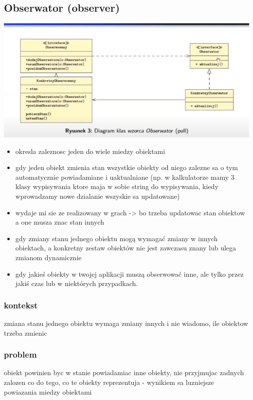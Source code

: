 \documentclass[11pt]{article}
\begin{document}
\subsection{Obserwator (observer)}
\label{sec:org1eeafc9}
\begin{center}
\includegraphics[width=.9\linewidth]{./obserwator.png}
\end{center}
\begin{itemize}
\item okresla zaleznosc jeden do wiele miedzy obiektami
\item gdy jeden obiekt zmienia stan wszystkie obiekty od niego zalezne sa o tym automatycznie powiadamiane i uaktualniane (np. w kalkulatorze mamy 3 klasy wypisywania ktore maja w sobie string do wypisywania, kiedy wprowadzamy nowe dzialanie wszyskie sa updatowane)
\item wydaje mi sie ze realizowany w grach -> bo trzeba updatowac stan obiektow a one musza znac stan innych
\item gdy zmiany stanu jednego obiektu mogą wymagać zmiany w innych obiektach, a konkretny zestaw obiektów nie jest zawczasu znany lub ulega zmianom dynamicznie
\item gdy jakieś obiekty w twojej aplikacji muszą obserwować inne, ale tylko przez jakiś czas lub w niektórych przypadkach.
\end{itemize}
\subsubsection{kontekst}
\label{sec:orgdaf6b5a}
zmiana stanu jednego obiektu wymaga zmiany innych i nie wiadomo, ile obiektow trzeba zmienic
\subsubsection{problem}
\label{sec:orgc1d819e}
obiekt powinien byc w stanie powiadamiac inne obiekty, nie przyjmujac zadnych zalozen co do tego, co te obiekty reprezentuja - wynikiem sa luzniejsze powiazania miedzy obiektami
\end{document}
